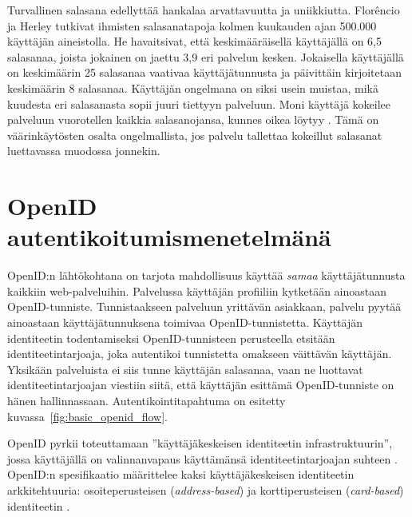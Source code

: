 \documentclass{tktltiki}
\begin{document}
Turvallinen salasana edellyttää hankalaa arvattavuutta ja uniikkiutta. Florêncio ja Herley \cite{study_of_passwords_07} tutkivat ihmisten salasanatapoja kolmen kuukauden ajan 500.000 käyttäjän aineistolla. He havaitsivat, että keskimääräisellä käyttäjällä on 6,5 salasanaa, joista jokainen on jaettu 3,9 eri palvelun kesken. Jokaisella käyttäjällä on keskimäärin 25 salasanaa vaativaa käyttäjätunnusta ja päivittäin kirjoitetaan keskimäärin 8 salasanaa. Käyttäjän ongelmana on siksi usein muistaa, mikä kuudesta eri salasanasta sopii juuri tiettyyn palveluun. Moni käyttäjä kokeilee palveluun vuorotellen kaikkia salasanojansa, kunnes oikea löytyy \cite{study_of_passwords_07}. Tämä on väärinkäytösten osalta ongelmallista, jos palvelu tallettaa kokeillut salasanat luettavassa muodossa jonnekin.


\section{OpenID autentikoitumismenetelmänä}
 \label{sec:openid_auth}

OpenID:n lähtökohtana on tarjota mahdollisuus käyttää \emph{samaa} käyttäjätunnusta kaikkiin web-palveluihin.
Palvelussa käyttäjän profiiliin kytketään ainoastaan OpenID-tunniste. Tunnistaakseen palveluun yrittävän asiakkaan, palvelu pyytää ainoastaan käyttäjätunnuksena toimivaa OpenID-tunnistetta. Käyttäjän identiteetin todentamiseksi OpenID-tunnisteen perusteella etsitään identiteetintarjoaja, joka autentikoi tunnistetta omakseen väittävän käyttäjän. Yksikään palveluista ei siis tunne käyttäjän salasanaa, vaan ne luottavat identiteetintarjoajan viestiin siitä, että käyttäjän esittämä OpenID-tunniste on hänen hallinnassaan. Autentikointitapahtuma on esitetty kuvassa~\ref{fig:basic_openid_flow}.

OpenID pyrkii toteuttamaan ''käyttäjäkeskeisen identiteetin infrastruktuurin'', jossa käyttäjällä on valinnanvapaus käyttämänsä identiteetintarjoajan suhteen \cite{openid_2.0_platform_2009}. OpenID:n spesifikaatio määrittelee kaksi käyttäjäkeskeisen identiteetin arkkitehtuuria: osoiteperusteisen (\emph{address-based}) ja korttiperusteisen (\emph{card-based}) identiteetin \cite{openid_2.0_specification_07}. 
\end{document}
